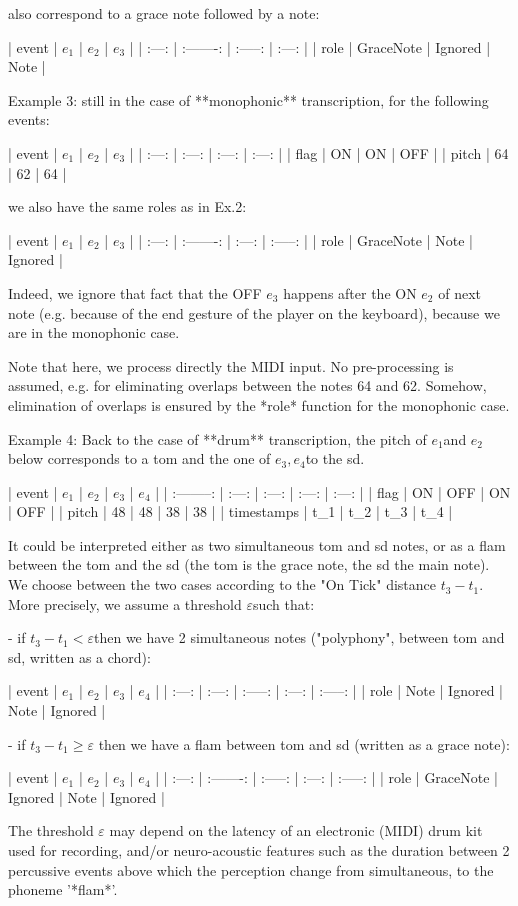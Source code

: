 also correspond to a grace note followed by a note:



| event |   $e_1$   |  $e_2$  | $e_3$ |
| :---: | :-------: | :-----: | :---: |
| role  | GraceNote | Ignored | Note  |



Example 3: still in the case of **monophonic** transcription, for the following events: 

| event | $e_1$ | $e_2$ | $e_3$ |
| :---: | :---: | :---: | :---: |
| flag  |  ON   |  ON   |  OFF  |
| pitch |  64   |  62   |  64   |

we also have the same roles as in Ex.2:



| event |   $e_1$   | $e_2$ |  $e_3$  |
| :---: | :-------: | :---: | :-----: |
| role  | GraceNote | Note  | Ignored |

Indeed, we ignore that fact that the OFF $e_3$ happens  after the ON $e_2$ of next note (e.g. because of the end gesture of the player on the keyboard), because we are in the monophonic case. 



Note that here, we process directly the MIDI input. No pre-processing is assumed, e.g. for eliminating overlaps between the notes 64 and 62. Somehow, elimination of overlaps is ensured by the *role* function for the monophonic case.



Example 4: Back to the case of **drum** transcription, the pitch of $e_1$​​ and $e_2$​ below corresponds to a tom and the one of $e_3, e_4$​ to the sd.

|   event    | $e_1$ | $e_2$ | $e_3$ | $e_4$ |
| :--------: | :---: | :---: | :---: | :---: |
|    flag    |  ON   |  OFF  |  ON   |  OFF  |
|   pitch    |  48   |  48   |  38   |  38   |
| timestamps |  t\_1  |  t\_2  |  t\_3  |  t\_4  |

It could be interpreted either as two simultaneous tom and sd notes, or as a flam between the tom and the sd (the tom is the grace note, the sd the main note). We choose between the two cases according to the "On Tick" distance $t_3 - t_1$.
More precisely, we assume a threshold $\varepsilon$​ such that:

- if $t_3 - t_1 < \varepsilon$​​ then we have 2 simultaneous notes  ("polyphony", between tom and sd, written as a chord):

| event | $e_1$ |  $e_2$  | $e_3$ |  $e_4$  |
| :---: | :---: | :-----: | :---: | :-----: |
| role  | Note  | Ignored | Note  | Ignored |

- if $t_3 - t_1 ≥ \varepsilon$ then we have a flam between tom and sd (written as a grace note):

| event |   $e_1$   |  $e_2$  | $e_3$ |  $e_4$  |
| :---: | :-------: | :-----: | :---: | :-----: |
| role  | GraceNote | Ignored | Note  | Ignored |

The threshold $\varepsilon$ may depend on the latency of an electronic  (MIDI) drum kit used for recording, and/or neuro-acoustic features such as the duration between 2 percussive events above which the perception change from simultaneous, to the phoneme '*flam*'.
